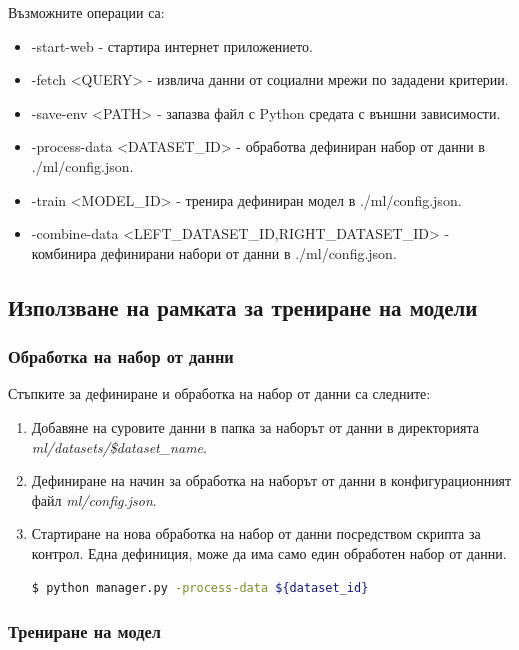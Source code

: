 \documentclass{article}
\begin{document}
Възможните операции са:

\begin{itemize}
\item -start-web - стартира интернет приложението.
\item -fetch <QUERY> - извлича данни от социални мрежи по зададени критерии.
\item -save-env <PATH> - запазва файл с Python средата с външни зависимости.
\item -process-data <DATASET\_ID> - обработва дефиниран набор от данни в ./ml/config.json.
\item -train <MODEL\_ID> - тренира дефиниран модел в ./ml/config.json.
\item -combine-data <LEFT\_DATASET\_ID,RIGHT\_DATASET\_ID> - комбинира дефинирани набори от данни в ./ml/config.json.
\end{itemize}

\subsection{Използване на рамката за трениране на модели}

\subsubsection{Обработка на набор от данни}

Стъпките за дефиниране и обработка на набор от данни са следните:

\begin{enumerate}
\item Добавяне на суровите данни в папка за наборът от данни в директорията \textit{ml/datasets/\${dataset\_name}}.
\item Дефиниране на начин за обработка на наборът от данни в конфигурационният файл \textit{ml/config.json}.
\item Стартиране на нова обработка на набор от данни посредством скрипта за контрол. Една дефиниция, може да има само
един обработен набор от данни.
\begin{lstlisting}[language=bash, numbers=none, caption=Обработка на набор от данни.]
$ python manager.py -process-data ${dataset_id}
\end{lstlisting}
\end{enumerate}

\subsubsection{Трениране на модел}
\end{document}
